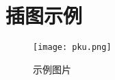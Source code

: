 \section{插图示例}

\begin{figure}[htbp]
\centering
\texttt{[image: pku.png]}
\caption{示例图片}
\end{figure}

\newpage